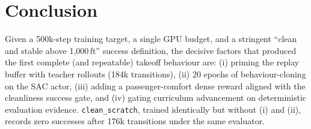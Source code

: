 \documentclass[11pt,a4paper]{article}
\begin{document}
\section{Conclusion}
Given a 500k-step training target, a single GPU budget, and a stringent ``clean and stable above 1,000\,ft''
success definition, the decisive factors that produced the first complete (and repeatable) takeoff behaviour are:
(i) priming the replay buffer with teacher rollouts (184k transitions), (ii) 20 epochs of behaviour-cloning on the SAC actor,
(iii) adding a passenger-comfort dense reward aligned with the cleanliness success gate, and (iv) gating
curriculum advancement on deterministic evaluation evidence. \texttt{clean\_scratch}, trained identically
but without (i) and (ii), records zero successes after 176k transitions under the same evaluator.
\end{document}

